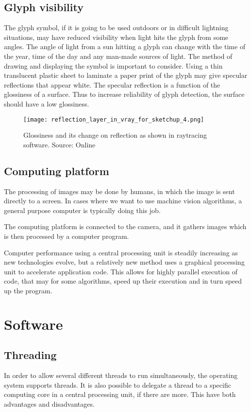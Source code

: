 \subsection{Glyph visibility}
The glyph symbol, if it is going to be used outdoors or in difficult lightning situations, may have reduced visibility when light hits the glyph from some angles. The angle of light from a sun hitting a glyph can change with the time of the year, time of the day and any man-made sources of light. The method of drawing and displaying the symbol is important to consider.
Using a thin translucent plastic sheet to laminate a paper print of the glyph may give specular reflections that appear white. The specular reflection is a function of the glossiness of a surface. Thus to increase reliability of glyph detection, the surface should have a low glossiness.

\begin{figure}[ht]
    \centering
    \texttt{[image: reflection\_layer\_in\_vray\_for\_sketchup\_4.png]}
    \caption{Glossiness and its change on reflection as shown in raytracing software. Source: Online \citet{gloss15}}
    \label{fig:cfs_simple_new}
\end{figure}
\FloatBarrier

\subsection{Computing platform}
The processing of images may be done by humans, in which the image is sent directly to a screen. In cases where we want to use machine vision algorithms, a general purpose computer is typically doing this job.

The computing platform is connected to the camera, and it gathers images which is then processed by a computer program.

Computer performance using a central processing unit is steadily increasing as new technologies evolve, but a relatively new method uses a graphical processing unit to accelerate application code. This allows for highly parallel execution of code, that may for some algorithms, speed up their execution and in turn speed up the program.

\section{Software}
\subsection{Threading}
In order to allow several different threads to run simultaneously, the operating system supports threads. It is also possible to delegate a thread to a specific computing core in a central processing unit, if there are more. This have both advantages and disadvantages.

